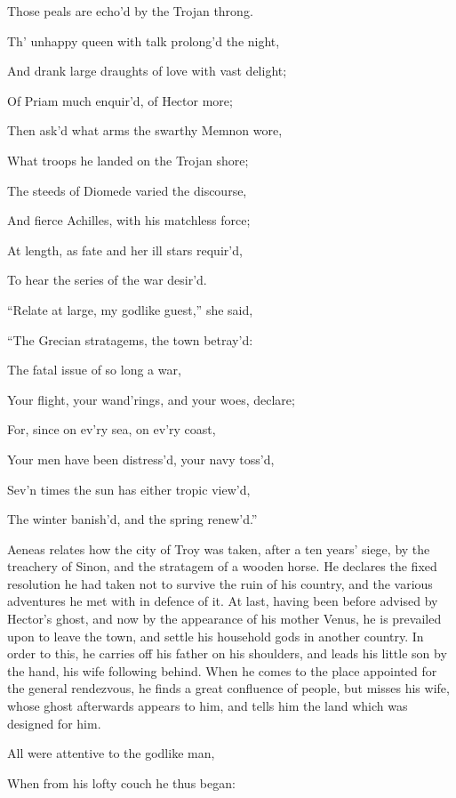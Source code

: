 Those peals are echo’d by the Trojan throng.

Th’ unhappy queen with talk prolong’d the night,

And drank large draughts of love with vast delight;

Of Priam much enquir’d, of Hector more;

Then ask’d what arms the swarthy Memnon wore,

What troops he landed on the Trojan shore;

The steeds of Diomede varied the discourse,

And fierce Achilles, with his matchless force;

At length, as fate and her ill stars requir’d,

To hear the series of the war desir’d.

“Relate at large, my godlike guest,” she said,

“The Grecian stratagems, the town betray’d:

The fatal issue of so long a war,

Your flight, your wand’rings, and your woes, declare;

For, since on ev’ry sea, on ev’ry coast,

Your men have been distress’d, your navy toss’d,

Sev’n times the sun has either tropic view’d,

The winter banish’d, and the spring renew’d.”


Aeneas relates how the city of Troy was taken, after a ten years’ siege,
by the treachery of Sinon, and the stratagem of a wooden horse. He declares
the fixed resolution he had taken not to survive the ruin of his country, and
the various adventures he met with in defence of it. At last, having been before
advised by Hector’s ghost, and now by the appearance of his mother Venus,
he is prevailed upon to leave the town, and settle his household gods in another
country. In order to this, he carries off his father on his shoulders, and leads
his little son by the hand, his wife following behind. When he comes to the
place appointed for the general rendezvous, he finds a great confluence of
people, but misses his wife, whose ghost afterwards appears to him, and tells
him the land which was designed for him.

All were attentive to the godlike man,

When from his lofty couch he thus began:

